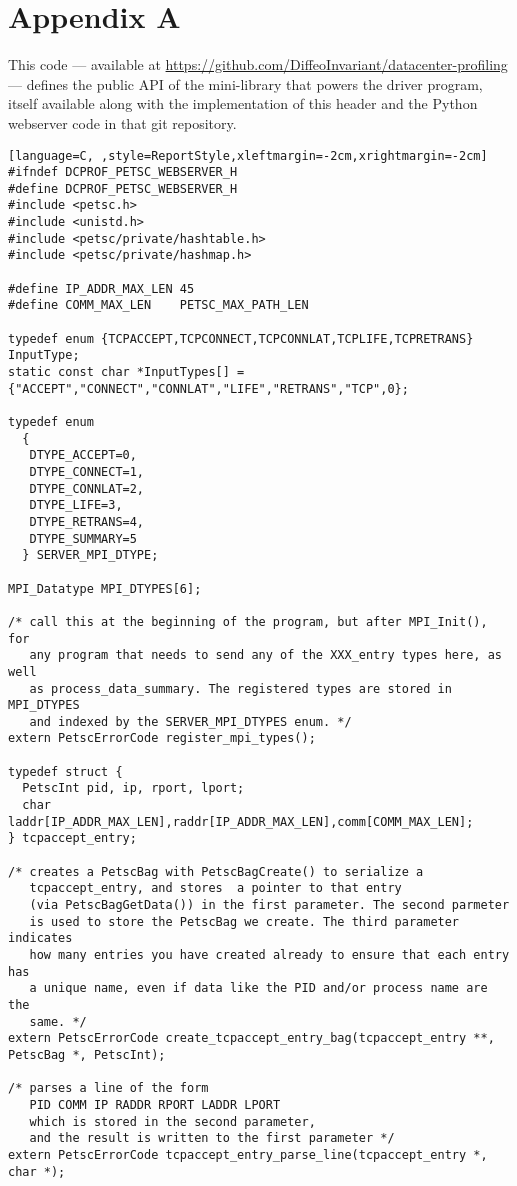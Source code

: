 \documentclass[11pt]{article}
\begin{document}
\section*{Appendix A}
This code --- available at \url{https://github.com/DiffeoInvariant/datacenter-profiling} --- defines the public API of the mini-library that powers the driver program, itself available along with the implementation of this header and the Python webserver code in that git repository.
\begin{lstlisting}[language=C, ,style=ReportStyle,xleftmargin=-2cm,xrightmargin=-2cm]
#ifndef DCPROF_PETSC_WEBSERVER_H
#define DCPROF_PETSC_WEBSERVER_H
#include <petsc.h>
#include <unistd.h>
#include <petsc/private/hashtable.h>
#include <petsc/private/hashmap.h>

#define IP_ADDR_MAX_LEN 45
#define COMM_MAX_LEN    PETSC_MAX_PATH_LEN

typedef enum {TCPACCEPT,TCPCONNECT,TCPCONNLAT,TCPLIFE,TCPRETRANS} InputType;
static const char *InputTypes[] = {"ACCEPT","CONNECT","CONNLAT","LIFE","RETRANS","TCP",0};

typedef enum 
  {
   DTYPE_ACCEPT=0,
   DTYPE_CONNECT=1,
   DTYPE_CONNLAT=2,
   DTYPE_LIFE=3,
   DTYPE_RETRANS=4,
   DTYPE_SUMMARY=5
  } SERVER_MPI_DTYPE;

MPI_Datatype MPI_DTYPES[6];

/* call this at the beginning of the program, but after MPI_Init(), for 
   any program that needs to send any of the XXX_entry types here, as well
   as process_data_summary. The registered types are stored in MPI_DTYPES
   and indexed by the SERVER_MPI_DTYPES enum. */
extern PetscErrorCode register_mpi_types();

typedef struct {
  PetscInt pid, ip, rport, lport;
  char     laddr[IP_ADDR_MAX_LEN],raddr[IP_ADDR_MAX_LEN],comm[COMM_MAX_LEN];
} tcpaccept_entry;

/* creates a PetscBag with PetscBagCreate() to serialize a
   tcpaccept_entry, and stores  a pointer to that entry
   (via PetscBagGetData()) in the first parameter. The second parmeter
   is used to store the PetscBag we create. The third parameter indicates
   how many entries you have created already to ensure that each entry has
   a unique name, even if data like the PID and/or process name are the 
   same. */
extern PetscErrorCode create_tcpaccept_entry_bag(tcpaccept_entry **, PetscBag *, PetscInt);

/* parses a line of the form 
   PID COMM IP RADDR RPORT LADDR LPORT
   which is stored in the second parameter, 
   and the result is written to the first parameter */
extern PetscErrorCode tcpaccept_entry_parse_line(tcpaccept_entry *, char *);


\end{lstlisting}
\end{document}
